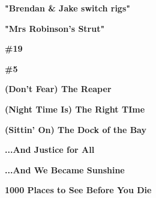 \begin{center}\textbf{"Brendan \& Jake switch rigs"}\end{center}
\newline
\vspace{10pt} 
\begin{center}\textbf{"Mrs Robinson's Strut"}\end{center}
\newline
\vspace{10pt} 
\begin{center}\textbf{\#19}\end{center}
\newline
\vspace{10pt} 
\begin{center}\textbf{\#5}\end{center}
\newline
\vspace{10pt} 
\begin{center}\textbf{(Don't Fear) The Reaper}\end{center}
\newline
\vspace{10pt} 
\begin{center}\textbf{(Night Time Is) The Right TIme}\end{center}
\newline
\vspace{10pt} 
\begin{center}\textbf{(Sittin' On) The Dock of the Bay}\end{center}
\newline
\vspace{10pt} 
\begin{center}\textbf{...And Justice for All}\end{center}
\newline
\vspace{10pt} 
\begin{center}\textbf{...And We Became Sunshine}\end{center}
\newline
\vspace{10pt} 
\begin{center}\textbf{1000 Places to See Before You Die}\end{center}
